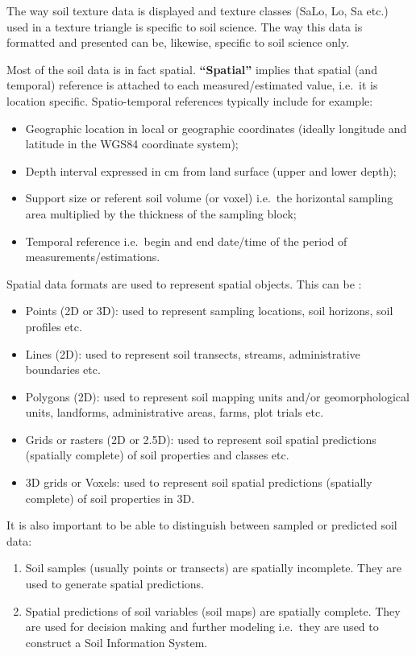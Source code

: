 \documentclass[10pt,b5paper,]{book}
\providecommand{\tightlist}{%
  \setlength{\itemsep}{0pt}\setlength{\parskip}{0pt}}
\theoremstyle{definition}
\theoremstyle{definition}
\theoremstyle{definition}
\theoremstyle{remark}
\begin{document}
The way soil texture data is displayed and texture classes (SaLo, Lo, Sa
etc.) used in a texture triangle is specific to soil science. The way
this data is formatted and presented can be, likewise, specific to soil
science only.

Most of the soil data is in fact spatial. \textbf{``Spatial''} implies
that spatial (and temporal) reference is attached to each
measured/estimated value, i.e.~it is location specific. Spatio-temporal
references typically include for example:

\begin{itemize}
\tightlist
\item
  Geographic location in local or geographic coordinates (ideally
  longitude and latitude in the WGS84 coordinate system);
\item
  Depth interval expressed in cm from land surface (upper and lower
  depth);
\item
  Support size or referent soil volume (or voxel) i.e.~the horizontal
  sampling area multiplied by the thickness of the sampling block;
\item
  Temporal reference i.e.~begin and end date/time of the period of
  measurements/estimations.
\end{itemize}

Spatial data formats are used to represent spatial objects. This can be
\citep[neteler2013open]{bivand2013classes}:

\begin{itemize}
\tightlist
\item
  Points (2D or 3D): used to represent sampling locations, soil
  horizons, soil profiles etc.
\item
  Lines (2D): used to represent soil transects, streams, administrative
  boundaries etc.
\item
  Polygons (2D): used to represent soil mapping units and/or
  geomorphological units, landforms, administrative areas, farms, plot
  trials etc.
\item
  Grids or rasters (2D or 2.5D): used to represent soil spatial
  predictions (spatially complete) of soil properties and classes etc.
\item
  3D grids or Voxels: used to represent soil spatial predictions
  (spatially complete) of soil properties in 3D.
\end{itemize}

It is also important to be able to distinguish between sampled or
predicted soil data:

\begin{enumerate}
\def\labelenumi{\arabic{enumi}.}
\tightlist
\item
  Soil samples (usually points or transects) are spatially incomplete.
  They are used to generate spatial predictions.
\item
  Spatial predictions of soil variables (soil maps) are spatially
  complete. They are used for decision making and further modeling
  i.e.~they are used to construct a Soil Information System.
\end{enumerate}
\end{document}
